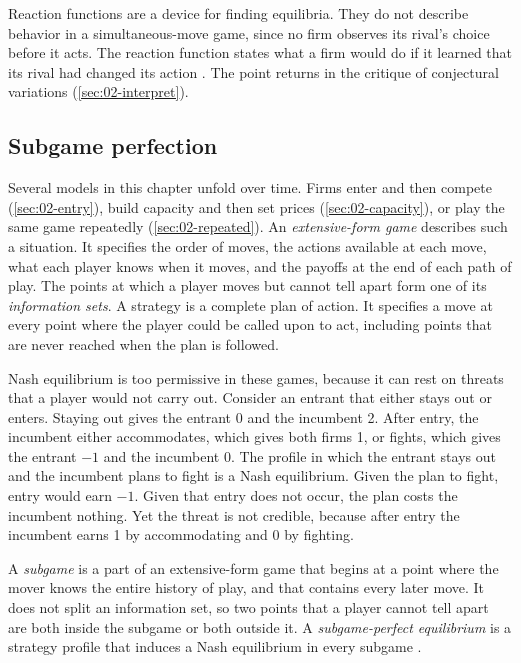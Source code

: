Reaction functions are a device for finding equilibria. They do not describe behavior in a simultaneous-move game,
since no firm observes its rival's choice before it acts. The reaction function states what a firm would do if it
learned that its rival had changed its action \citep[introduction to Part~II]{Tirole1988}. The point returns in the
critique of conjectural variations (\cref{sec:02-interpret}).

\subsection{Subgame perfection}\label{sec:02-spe}

Several models in this chapter unfold over time. Firms enter and then compete (\cref{sec:02-entry}), build capacity
and then set prices (\cref{sec:02-capacity}), or play the same game repeatedly (\cref{sec:02-repeated}). An
\emph{extensive-form game} describes such a situation. It specifies the order of moves, the actions available at each
move, what each player knows when it moves, and the payoffs at the end of each path of play. The points at which a
player moves but cannot tell apart form one of its \emph{information sets}. A strategy is a complete plan of action.
It specifies a move at every point where the player could be called upon to act, including points that are never
reached when the plan is followed.

Nash equilibrium is too permissive in these games, because it can rest on threats that a player would not carry out.
Consider an entrant that either stays out or enters. Staying out gives the entrant 0 and the incumbent 2. After entry,
the incumbent either accommodates, which gives both firms 1, or fights, which gives the entrant $-1$ and the
incumbent 0. The profile in which the entrant stays out and the incumbent plans to fight is a Nash equilibrium. Given
the plan to fight, entry would earn $-1$. Given that entry does not occur, the plan costs the incumbent nothing. Yet
the threat is not credible, because after entry the incumbent earns 1 by accommodating and 0 by fighting.

\begin{definition}\label{def:02-spe}
A \emph{subgame} is a part of an extensive-form game that begins at a point where the mover knows the entire history
of play, and that contains every later move. It does not split an information set, so two points that a player
cannot tell apart are both inside the subgame or both outside it. A \emph{subgame-perfect equilibrium} is a strategy
profile that induces a Nash equilibrium in every subgame \citep{Selten1965}.
\end{definition}

